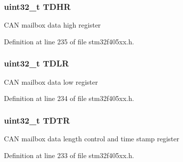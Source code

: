 \subsubsection[{\texorpdfstring{T\+D\+HR}{TDHR}}]{ uint32\+\_\+t T\+D\+HR}\hypertarget{struct_c_a_n___tx_mail_box___type_def_a90f7c1cf22683459c632d6040366eddf}{}\label{struct_c_a_n___tx_mail_box___type_def_a90f7c1cf22683459c632d6040366eddf}
C\+AN mailbox data high register 

Definition at line 235 of file stm32f405xx.\+h.

\subsubsection[{\texorpdfstring{T\+D\+LR}{TDLR}}]{ uint32\+\_\+t T\+D\+LR}\hypertarget{struct_c_a_n___tx_mail_box___type_def_aded1359e1a32512910bff534d57ade68}{}\label{struct_c_a_n___tx_mail_box___type_def_aded1359e1a32512910bff534d57ade68}
C\+AN mailbox data low register 

Definition at line 234 of file stm32f405xx.\+h.

\subsubsection[{\texorpdfstring{T\+D\+TR}{TDTR}}]{ uint32\+\_\+t T\+D\+TR}\hypertarget{struct_c_a_n___tx_mail_box___type_def_aed87bed042dd9523ce086119a3bab0ea}{}\label{struct_c_a_n___tx_mail_box___type_def_aed87bed042dd9523ce086119a3bab0ea}
C\+AN mailbox data length control and time stamp register 

Definition at line 233 of file stm32f405xx.\+h.

